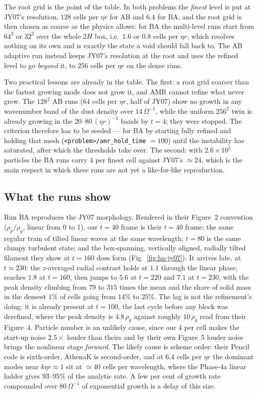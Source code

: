 \documentclass[11pt]{article}
\newcommand{\code}[1]{\texttt{#1}}
\begin{document}
The root grid is the point of the table. In both problems the \emph{finest} level is put
at JY07's resolution, $128$ cells per $\eta r$ for AB and $6.4$ for BA, and the root grid
is then chosen as coarse as the physics allows: for BA the multi-level runs start from
$64^2$ or $32^2$ over the whole $2H$ box, i.e.\ $1.6$ or $0.8$ cells per $\eta r$, which
resolves nothing on its own and is exactly the state a void should fall back to. The AB
adaptive run instead keeps JY07's resolution at the root and uses the refined level to go
\emph{beyond} it, to $256$ cells per $\eta r$ on the dense rims.

Two practical lessons are already in the table. The first: a root grid coarser than the
fastest growing mode does not grow it, and AMR cannot refine what never grew. The
$128^2$ AB runs ($64$ cells per $\eta r$, half of JY07) show no growth in any wavenumber
band of the dust density over $14\,\Omega^{-1}$, while the uniform $256^2$ twin is already
growing in the $20$--$80\,(\eta r)^{-1}$ bands by $t = 4$; they were stopped. The
criterion therefore has to be seeded --- for BA by starting fully refined and holding
that mesh (\code{<problem>/amr\_hold\_time} $= 100$) until the instability has saturated,
after which the thresholds take over. The second: with $2.6\times10^5$ particles the BA
runs carry $4$ per finest cell against JY07's $\simeq 24$, which is the main respect in
which these runs are not yet a like-for-like reproduction.

\subsection{What the runs show}
\label{sec:phase6-what}

Run BA reproduces the JY07 morphology. Rendered in their Figure~2 convention
($\rho_p/\rho_g$, linear from 0 to 1), our $t = 40$ frame is their $t = 40$ frame: the
same regular train of tilted linear waves at the same wavelength; $t = 80$ is the same
clumpy turbulent state; and the box-spanning, vertically aligned, radially tilted
filament they show at $t = 160$ does form (Fig.~\ref{fig:ba-jy07}). It arrives late,
at $t \simeq 230$: the
$z$-averaged radial contrast holds at $1.1$ through the linear phase, reaches $1.8$ at
$t = 160$, then jumps to $5.6$ at $t = 220$ and $7.1$ at $t = 230$, with the peak density
climbing from $79$ to $315$ times the mean and the share of solid mass in the densest
$1\%$ of cells going from $14\%$ to $25\%$. The lag is not the refinement's doing: it is
already present at $t = 100$, the last cycle before any block was derefined, where the
peak density is $4.8\,\rho_g$ against roughly $10\,\rho_g$ read from their Figure~4.
Particle number is an unlikely cause, since our $4$ per cell makes the start-up noise
$2.5\times$ louder than theirs and by their own Figure~5 louder noise brings the nonlinear
stage \emph{forward}. The likely cause is scheme order: their Pencil code is sixth-order,
AthenaK is second-order, and at $6.4$ cells per $\eta r$ the dominant modes near
$k\eta r \approx 1$ sit at $\simeq 40$ cells per wavelength, where the Phase-4a linear
ladder gives $93$--$95\%$ of the analytic rate. A few per cent of growth rate compounded
over $80\,\Omega^{-1}$ of exponential growth is a delay of this size.
\end{document}
